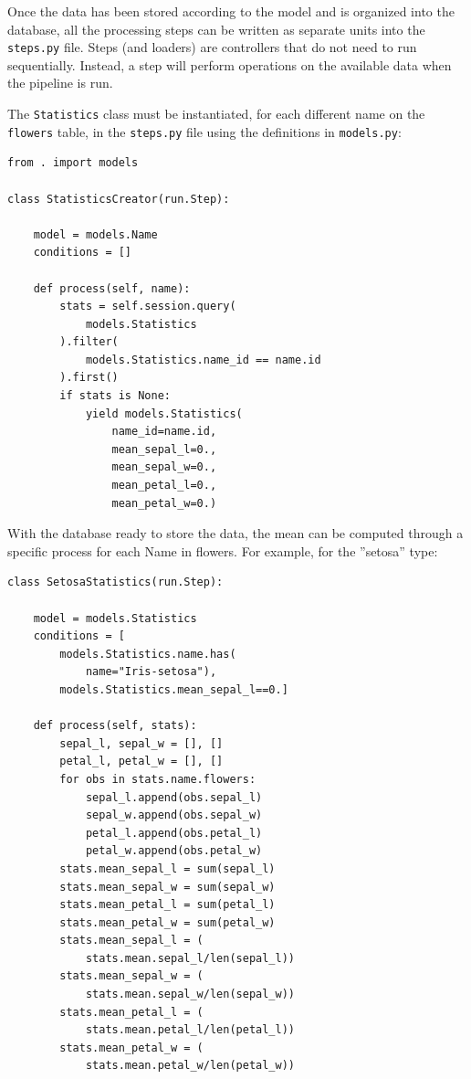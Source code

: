 \documentclass[final,5p,times,twocolumn,authoryear]{elsarticle}
\begin{document}
Once the data has been stored according to the model and is organized
into the database, all the processing steps can be written as
separate units into the \verb|steps.py| file.
%
Steps (and loaders) are controllers that do not need to run
sequentially.
%
Instead, a step will perform operations on
the available data when the pipeline is run.





The \verb|Statistics| class must be instantiated, for each different
name on the \verb|flowers| table, in the \verb|steps.py| file
using the definitions in \verb|models.py|:

\begin{verbatim}
from . import models

class StatisticsCreator(run.Step):

    model = models.Name
    conditions = []

    def process(self, name):
        stats = self.session.query(
            models.Statistics
        ).filter(
            models.Statistics.name_id == name.id
        ).first()
        if stats is None:
            yield models.Statistics(
                name_id=name.id,
                mean_sepal_l=0.,
                mean_sepal_w=0.,
                mean_petal_l=0.,
                mean_petal_w=0.)
\end{verbatim}

With the database ready to store the data, the mean can be computed
through a specific process for each Name in flowers.  For example,
for the ''setosa'' type:

\begin{verbatim}
class SetosaStatistics(run.Step):

    model = models.Statistics
    conditions = [
        models.Statistics.name.has(
            name="Iris-setosa"),
        models.Statistics.mean_sepal_l==0.]

    def process(self, stats):
        sepal_l, sepal_w = [], []
        petal_l, petal_w = [], []
        for obs in stats.name.flowers:
            sepal_l.append(obs.sepal_l)
            sepal_w.append(obs.sepal_w)
            petal_l.append(obs.petal_l)
            petal_w.append(obs.petal_w)
        stats.mean_sepal_l = sum(sepal_l)
        stats.mean_sepal_w = sum(sepal_w)
        stats.mean_petal_l = sum(petal_l)
        stats.mean_petal_w = sum(petal_w)
        stats.mean_sepal_l = (
            stats.mean.sepal_l/len(sepal_l))
        stats.mean_sepal_w = (
            stats.mean.sepal_w/len(sepal_w))
        stats.mean_petal_l = (
            stats.mean.petal_l/len(petal_l))
        stats.mean_petal_w = (
            stats.mean.petal_w/len(petal_w))
\end{verbatim}
\end{document}

